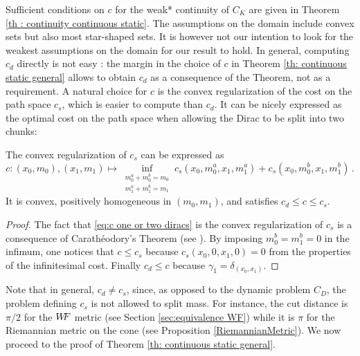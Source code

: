 %
Sufficient conditions on $c$ for the weak* continuity of $C_K$ are given in Theorem \ref{th : continuity continuous static}. The assumptions on the domain include convex sets but also most star-shaped sets. It is however not our intention to look for the weakest assumptions on the domain for our result to hold.  In general, computing $c_d$ directly is not easy : the margin in the choice of $c$ in Theorem \ref{th: continuous static general} allows to obtain $c_d$ as a consequence of the Theorem, not as a requirement. A natural choice for $c$ is the convex regularization of the cost on the path space $c_s$, which is easier to compute than $c_d$. It can be nicely expressed as the optimal cost on the path space when allowing the Dirac to be split into two chunks:
%
\begin{proposition}
\label{prop : alternative dynamic/static}
The convex regularization of $c_s$ can be expressed as
\begin{equation}\label{eq:c one or two diracs}
c : (x_0,m_0) , (x_1,m_1 ) \mapsto \inf_{\substack{m_0^a+m_0^b=m_0\\m_1^a+m_1^b=m_1}} c_s(x_0,m_0^a,x_1,m_1^a)+ c_s(x_0,m_0^b,x_1,m_1^b)\, .
\end{equation}
It is convex, positively homogeneous in $(m_0,m_1)$, and satisfies $c_d\leq c \leq c_s$. %
\end{proposition}

\begin{proof}%
The fact that \eqref{eq:c one or two diracs} is the convex regularization of $c_s$ is a consequence of Carath\'eodory's Theorem (see \cite[Corollary 17.1.6]{rockafellar2015convex}). By imposing $m_0^b = m_1^b = 0$ in the infimum, one notices that $c \leq c_s$ because $c_s(x_0,0,x_1,0)=0$ from the properties of the infinitesimal cost. Finally $c_d\leq c$ because $\gamma_1 = \delta_{(x_0,x_1)}$.
\end{proof}

Note that in general, $c_d\neq c_s$, since, as opposed to the dynamic problem $C_D$, the problem defining $c_s$ is not allowed to split mass. For instance, the cut distance is $\pi/2$ for the $W\! \! F$ metric (see Section \ref{sec:equivalence WF}) while it is $\pi$ for the Riemannian metric on the cone (see Proposition \ref{RiemannianMetric}). We now proceed to the proof of Theorem \ref{th: continuous static general}.

